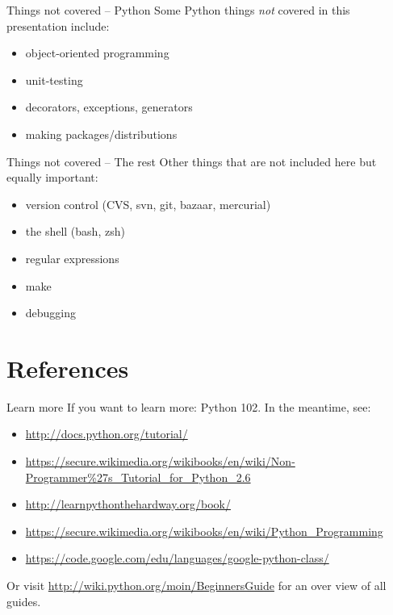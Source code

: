 \documentclass[xetex,10pt]{beamer}
\def\spacer{\vspace*{1em}}
\begin{document}
\begin{frame}[fragile]{Things not covered -- Python}
	Some Python things \emph{not} covered in this presentation include:
	\spacer
	\begin{itemize}
		\item object-oriented programming
		\item unit-testing
		\item decorators, exceptions, generators
		\item making packages/distributions
	\end{itemize}
\end{frame}

\begin{frame}[fragile]{Things not covered -- The rest}
	Other things that are not included here but equally important:
	\spacer
	\begin{itemize}
		\item version control (CVS, svn, git, bazaar, mercurial)
		\item the shell (bash, zsh)
		\item regular expressions
		\item make
		\item debugging
	\end{itemize}
\end{frame}

\section*{References}

\begin{frame}{Learn more}
	If you want to learn more: Python 102.
	\spacer
	In the meantime, see:
	\begin{itemize}
		\item \url{http://docs.python.org/tutorial/}
		\item \url{https://secure.wikimedia.org/wikibooks/en/wiki/Non-Programmer\%27s_Tutorial_for_Python_2.6}
		\item \url{http://learnpythonthehardway.org/book/}
		\item \url{https://secure.wikimedia.org/wikibooks/en/wiki/Python_Programming}
		\item \url{https://code.google.com/edu/languages/google-python-class/}
	\end{itemize}
	
	Or visit \url{http://wiki.python.org/moin/BeginnersGuide} for an over view of all guides.
	
\end{frame}
\end{document}
